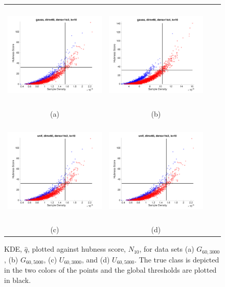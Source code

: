 \documentclass[graybox]{svmult}
\begin{document}
\begin{figure}
\centering
    \begin{tabular}{cccc}
        \includegraphics[width=2.5in,height=2in]{../fig/gauss-dim60-1to2-k10-GlobKDEGlobHubs.png} &
        \includegraphics[width=2.5in,height=2in]{../fig/gauss-dim60-1to4-k10-GlobKDEGlobHubs.png} \\
        {\scriptsize (a)} &  {\scriptsize (b)} \\
        \includegraphics[width=2.5in,height=2in]{../fig/unif-dim60-1to2-k10-GlobKDEGlobHubs.png}&
        \includegraphics[width=2.5in,height=2in]{../fig/unif-dim60-1to2-k10-GlobKDEGlobHubs.png}\\
        {\scriptsize (c)} &  {\scriptsize (d)} 
      \end{tabular}
      \caption{KDE, $\hat{q}$, plotted against hubness score, $N_{10}$, for data sets (a) $G_{60,3000}$, (b) $G_{60,5000}$, (c) $U_{60,3000}$, and (d) $U_{60,5000}$. The true class is depicted in the two colors of the points and the global thresholds are plotted in black.}\label{fig:GlobDensHubs}
\end{figure}
\end{document}
